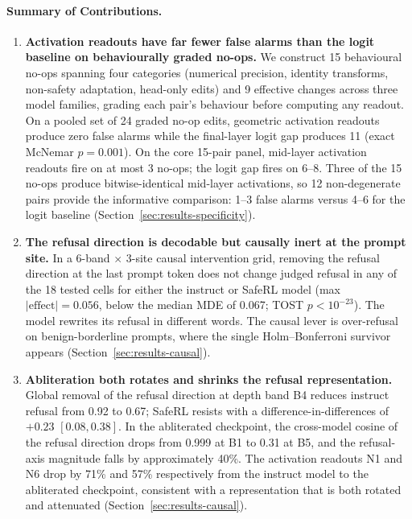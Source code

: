 \documentclass[11pt,letterpaper]{article}
\begin{document}
\paragraph{Summary of Contributions.}
\begin{enumerate}
\item \textbf{Activation readouts have far fewer false alarms than the logit baseline on behaviourally graded no-ops.} We construct 15 behavioural no-ops spanning four categories (numerical precision, identity transforms, non-safety adaptation, head-only edits) and 9 effective changes across three model families, grading each pair's behaviour before computing any readout. On a pooled set of 24 graded no-op edits, geometric activation readouts produce zero false alarms while the final-layer logit gap produces 11 (exact McNemar $p = 0.001$). On the core 15-pair panel, mid-layer activation readouts fire on at most 3 no-ops; the logit gap fires on 6--8. Three of the 15 no-ops produce bitwise-identical mid-layer activations, so 12 non-degenerate pairs provide the informative comparison: 1--3 false alarms versus 4--6 for the logit baseline (Section~\ref{sec:results-specificity}).

\item \textbf{The refusal direction is decodable but causally inert at the prompt site.} In a 6-band $\times$ 3-site causal intervention grid, removing the refusal direction at the last prompt token does not change judged refusal in any of the 18 tested cells for either the instruct or SafeRL model (max $|\text{effect}| = 0.056$, below the median MDE of 0.067; TOST $p < 10^{-23}$). The model rewrites its refusal in different words. The causal lever is over-refusal on benign-borderline prompts, where the single Holm--Bonferroni survivor appears (Section~\ref{sec:results-causal}).

\item \textbf{Abliteration both rotates and shrinks the refusal representation.} Global removal of the refusal direction at depth band B4 reduces instruct refusal from 0.92 to 0.67; SafeRL resists with a difference-in-differences of $+0.23$ $[0.08, 0.38]$. In the abliterated checkpoint, the cross-model cosine of the refusal direction drops from 0.999 at B1 to 0.31 at B5, and the refusal-axis magnitude falls by approximately 40\%. The activation readouts N1 and N6 drop by 71\% and 57\% respectively from the instruct model to the abliterated checkpoint, consistent with a representation that is both rotated and attenuated (Section~\ref{sec:results-causal}).


\end{enumerate}
\end{document}
